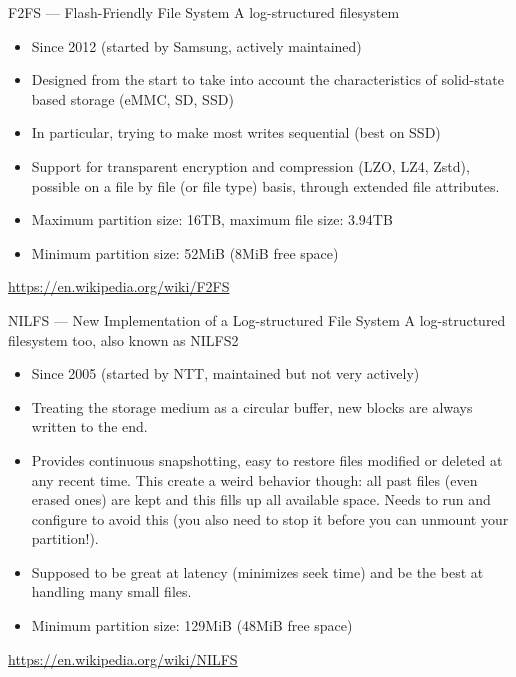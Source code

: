 \begin{frame}{F2FS --- Flash-Friendly File System}
    A log-structured filesystem
    \begin{itemize}
        \item Since 2012 (started by Samsung, actively maintained)
        \item Designed from the start to take into account the
              characteristics of solid-state based storage (eMMC, SD, SSD)
        \item In particular, trying to make most writes sequential (best on SSD)
        \item Support for transparent encryption and compression (LZO,
              LZ4, Zstd), possible on a file by file (or file type)
              basis, through extended file attributes.
        \item Maximum partition size: 16TB, maximum file size: 3.94TB
        \item Minimum partition size: 52MiB (8MiB free space)
    \end{itemize}
    \url{https://en.wikipedia.org/wiki/F2FS}
\end{frame}

\begin{frame}{NILFS --- New Implementation of a Log-structured File System}
    A log-structured filesystem too, also known as NILFS2
    \begin{itemize}
        \item Since 2005 (started by NTT, maintained but not very actively)
        \item Treating the storage medium as a circular buffer, new blocks are always written to the end.
        \item Provides continuous snapshotting, easy to restore files modified or deleted at any recent time.
              This create a weird behavior though: all past files (even erased ones) are kept and
              this fills up all available space. Needs to run and configure  to avoid this
              (you also need to stop it before you can unmount your partition!).
        \item Supposed to be great at latency (minimizes seek time) and be the best at handling
              many small files.
        \item Minimum partition size: 129MiB (48MiB free space)
    \end{itemize}
    \url{https://en.wikipedia.org/wiki/NILFS}
\end{frame}

